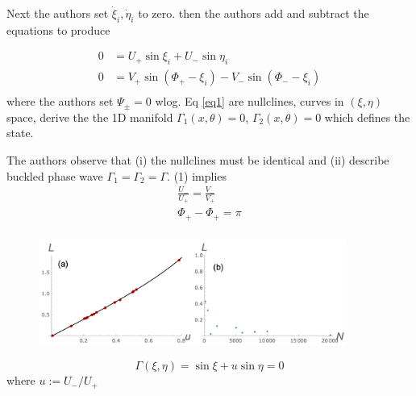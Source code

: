 \documentclass[10pt,aspectratio=43,mathserif,table]{beamer}
\begin{document}
\begin{frame}
    Next the authors set $\dot{\xi}_i, \dot{\eta}_i$ to zero. then the authors add and subtract the equations to produce
        
    \begin{equation}\label{eq1}
        \begin{aligned}
            0&=U_+\sin \xi _i+U_-\sin \eta _i\\
            0&=V_+\sin \left( \Phi _+-\xi _i \right) -V_-\sin \left( \Phi _--\xi _i \right)\\
        \end{aligned}
    \end{equation}
    where the authors set $\Psi_{\pm}=0$ wlog. Eq \ref{eq1} are nullclines,
    curves in $(\xi, \eta)$ space, derive the the 1D manifold $\Gamma_1 \left( x,\theta \right) = 0$, $\Gamma_2 \left( x,\theta \right) = 0$ which defines the state.

    The authors observe that (i) the nullclines must be identical and (ii) describe buckled phase wave $\Gamma_1 = \Gamma_2 = \Gamma$. (1) implies 
    $$
    \begin{array}{c}
        \frac{U_-}{U_+}=\frac{V_-}{V_+}\\
        \Phi _+-\Phi _+=\pi\\
    \end{array}
    $$

\end{frame}

    \begin{frame}
        \begin{figure}
            \centering
            \includegraphics[width=0.9\textwidth]{fig6.png}
        \end{figure}
    $$
    \Gamma(\xi, \eta) = \sin\xi + u\sin \eta = 0
    $$
    where $u:=U_-/U_+$

\end{frame}

\end{document}
